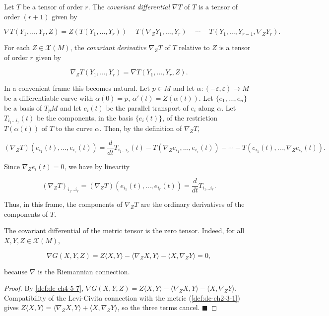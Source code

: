 \begin{definition}
  \label{def:dc-ch4-5-7}
  \leanok
  Let $T$ be a tensor of order $r$. The \emph{covariant differential} $\nabla T$ of $T$
  is a tensor of order $(r+1)$ given by
  
  $$
  \nabla T(Y_1,\dots,Y_r,Z)=Z(T(Y_1,\dots,Y_r))-T(\nabla_Z Y_1,\dots,Y_r)-\cdots-T(Y_1,\dots,Y_{r-1},\nabla_Z Y_r).
  $$
  
  For each $Z\in\mathcal{X}(M)$, the \emph{covariant derivative} $\nabla_Z T$ of $T$
  relative to $Z$ is a tensor of order $r$ given by
  
  $$
  \nabla_Z T(Y_1,\dots,Y_r)=\nabla T(Y_1,\dots,Y_r,Z).
  $$
  
  In a convenient frame this becomes natural. Let $p\in M$ and let
  $\alpha:(-\varepsilon,\varepsilon)\to M$ be a differentiable curve with $\alpha(0)=p$,
  $\alpha'(t)=Z(\alpha(t))$. Let $\{e_1,\dots,e_n\}$ be a basis of $T_pM$ and let
  $e_i(t)$ be the parallel transport of $e_i$ along $\alpha$. Let $T_{i_1\dots i_r}(t)$
  be the components, in the basis $\{e_i(t)\}$, of the restriction $T(\alpha(t))$ of
  $T$ to the curve $\alpha$. Then, by the definition of $\nabla_Z T$,
  
  $$
  (\nabla_Z T)(e_{i_1}(t),\dots,e_{i_r}(t))=\frac{d}{dt}T_{i_1\dots i_r}(t)-T(\nabla_Z e_{i_1},\dots,e_{i_r}(t))-\cdots-T(e_{i_1}(t),\dots,\nabla_Z e_{i_r}(t)).
  $$
  
  Since $\nabla_Z e_i(t)=0$, we have by linearity
  
  $$
  (\nabla_Z T)_{i_1\dots i_r}=(\nabla_Z T)(e_{i_1}(t),\dots,e_{i_r}(t))=\frac{d}{dt}T_{i_1\dots i_r}.
  $$
  
  Thus, in this frame, the components of $\nabla_ZT$ are the ordinary derivatives
  of the components of $T$.
\end{definition}

\begin{example}
  \label{ex:dc-ch4-5-8}
  \leanok
  The covariant differential of the metric tensor is the zero tensor. Indeed, for
  all $X,Y,Z\in\mathcal{X}(M)$,

  $$
  \nabla G(X,Y,Z)=Z\langle X,Y\rangle-\langle\nabla_Z X,Y\rangle-\langle X,\nabla_Z Y\rangle=0,
  $$

  because $\nabla$ is the Riemannian connection.
\end{example}
\begin{proof}
  \leanok
  \sketch
  By \cref{def:dc-ch4-5-7}, $\nabla G(X,Y,Z)=Z\langle X,Y\rangle-\langle\nabla_Z X,Y\rangle
  -\langle X,\nabla_Z Y\rangle$. Compatibility of the Levi-Civita connection with the
  metric (\cref{def:dc-ch2-3-1}) gives $Z\langle X,Y\rangle=\langle\nabla_Z X,Y\rangle
  +\langle X,\nabla_Z Y\rangle$, so the three terms cancel. $\blacksquare$
\end{proof}

